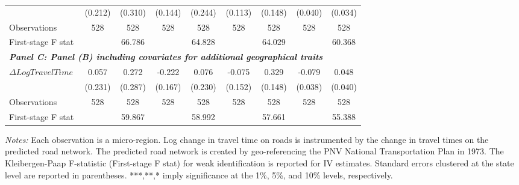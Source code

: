 \begin{table}[p]
{{\begin{tabular}{l*{8}{c}}
&     (0.212)         &     (0.310)         &     (0.144)         &     (0.244)         &     (0.113)         &     (0.148)         &     (0.040)         &     (0.034)         \\
Observations        &         528         &         528         &         528         &         528         &         528         &         528         &         528         &         528         \\
First-stage F stat  &                     &      66.786         &                     &      64.828         &                     &      64.029         &                     &      60.368         \\
\hline
\multicolumn{8}{l}{\linebreak \textbf{\textit{Panel C: Panel (B) including covariates for additional geographical traits}}} \\
$\Delta Log Travel Time$&       0.057         &       0.272         &      -0.222         &       0.076         &      -0.075         &       0.329\sym{**} &      -0.079\sym{**} &       0.048         \\
&     (0.231)         &     (0.287)         &     (0.167)         &     (0.230)         &     (0.152)         &     (0.148)         &     (0.038)         &     (0.040)         \\
Observations        &         528         &         528         &         528         &         528         &         528         &         528         &         528         &         528         \\
First-stage F stat  &                     &      59.867         &                     &      58.992         &                     &      57.661         &                     &      55.388         \\
\hline\hline
\end{tabular}}
}
\usebox{\tabbox}
\begin{minipage}{\wd\tabbox}
    \vspace{0.1cm}
    {\footnotesize \sloppy \textit{Notes: } Each observation is a micro-region. Log change in travel time on roads is instrumented by the change in travel times on the predicted road network. The predicted road network is created by geo-referencing the PNV National Transportation Plan in 1973. The Kleibergen-Paap F-statistic (First-stage F stat) for weak identification is reported for IV estimates. Standard errors clustered at the state level are reported in parentheses. ***,**,* imply significance at the 1\%, 5\%, and 10\% levels, respectively.}
\end{minipage}
\endgroup
\end{table}
